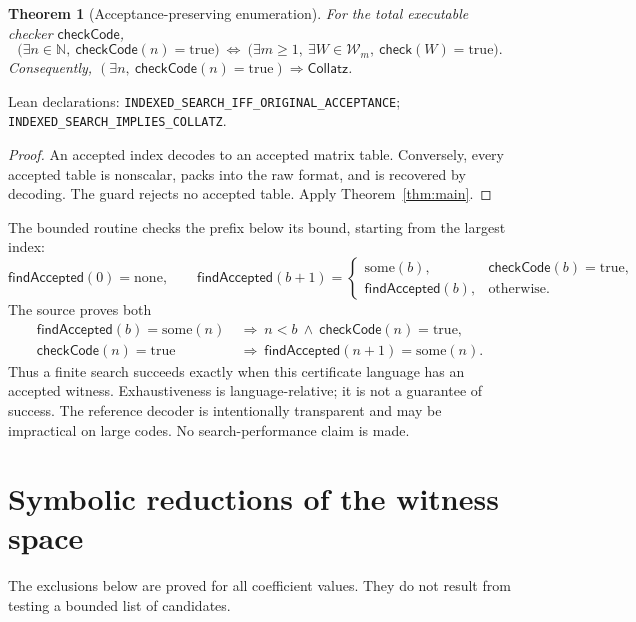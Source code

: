 \documentclass[11pt,a4paper]{article}
\newtheorem{theorem}{Theorem}[section]
\theoremstyle{definition}
\newcommand{\NN}{\mathbb N}
\newcommand{\CC}{\mathsf{Collatz}}
\newcommand{\chk}{\mathsf{check}}
\newcommand{\ck}{\mathsf{checkCode}}
\newcommand{\finda}{\mathsf{findAccepted}}
\newcommand{\name}[1]{{\small\texttt{#1}}}
\newcommand{\source}[1]{\par{\footnotesize\color{ink}Lean declarations: #1.}\par}
\begin{document}
\begin{theorem}[Acceptance-preserving enumeration]
For the total executable checker $\ck$,
\[
 \boxed{
 \bigl(\exists n\in\NN,\ \ck(n)=\mathrm{true}\bigr)
 \ \Longleftrightarrow\
 \bigl(\exists m\ge1,\ \exists W\in\mathcal W_m,\
                      \chk(W)=\mathrm{true}\bigr).}
\]
Consequently, $(\exists n,\ \ck(n)=\mathrm{true})\Longrightarrow\CC$.
\end{theorem}
\source{\name{INDEXED\_SEARCH\_IFF\_ORIGINAL\_ACCEPTANCE};
\name{INDEXED\_SEARCH\_IMPLIES\_COLLATZ}}

\begin{proof}
An accepted index decodes to an accepted matrix table. Conversely, every
accepted table is nonscalar, packs into the raw format, and is recovered by
decoding. The guard rejects no accepted table. Apply Theorem~\ref{thm:main}.
\end{proof}

The bounded routine checks the prefix below its bound, starting from the
largest index:
\[
 \finda(0)=\mathrm{none},\qquad
 \finda(b+1)=
 \begin{cases}
 \mathrm{some}(b),&\ck(b)=\mathrm{true},\\
 \finda(b),&\text{otherwise}.
 \end{cases}
\]
The source proves both
\begin{align*}
 \finda(b)=\mathrm{some}(n)&\ \Longrightarrow\
                 n<b\ \land\ \ck(n)=\mathrm{true},\\
 \ck(n)=\mathrm{true}&\ \Longrightarrow\
                 \finda(n+1)=\mathrm{some}(n).
\end{align*}
Thus a finite search succeeds exactly when this certificate language has an
accepted witness. Exhaustiveness is language-relative; it is not a guarantee
of success. The reference decoder is intentionally transparent and may be
impractical on large codes. No search-performance claim is made.

\newpage
\section{Symbolic reductions of the witness space}
The exclusions below are proved for all coefficient values. They do not
result from testing a bounded list of candidates.
\end{document}
